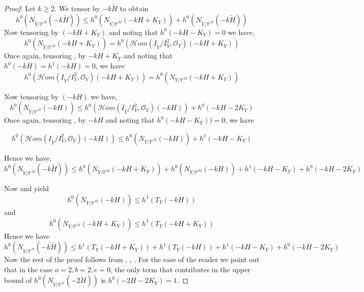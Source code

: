 \documentclass[11pt,twoside]{amsart}
\theoremstyle{plain}
\numberwithin{equation}{section}
\theoremstyle{definition}
\begin{document}
\begin{proof}
   Let $k \geq 2$. We tensor  by $-k\widetilde{H}$ to obtain
    $$h^0(N_{\widetilde{Y}/\mathbb{P}^M}(-k\widetilde{H})) \leq  h^0(N_{\widetilde{Y}/\mathbb{P}^M}(-kH+K_Y)) + h^0(N_{\widetilde{Y}/\mathbb{P}^M}(-k\widetilde{H}))$$
    Now tensoring  by $(-kH+K_Y)$ and noting that $h^0(-kH-K_Y) = 0$ we have,
    $$h^0(N_{\widetilde{Y}/\mathbb{P}^M}(-kH+K_Y)) = h^0(\mathcal{H}om(I_{\widetilde{Y}}/I_{Y}^2, \mathcal{O}_Y)(-kH+K_Y))$$
    Once again, tensoring , by $-kH+K_Y$ and noting that $h^0(-kH) = h^1(-kH) = 0$, we have 
    $$h^0(\mathcal{H}om(I_{\widetilde{Y}}/I_{Y}^2, \mathcal{O}_Y)(-kH+K_Y)) = h^0(N_{Y/\mathbb{P}^M}(-kH+K_Y))$$

    
    Now tensoring  by $(-kH)$ we have,
    $$h^0(N_{\widetilde{Y}/\mathbb{P}^M}(-kH)) \leq h^0(\mathcal{H}om(I_{\widetilde{Y}}/I_{Y}^2, \mathcal{O}_Y)(-kH))+h^0(-kH-2K_Y)$$
    Once again, tensoring , by $-kH$ and noting that $h^0(-kH-K_Y)) = 0$, we have 
   

\color{black}
    $$h^0(\mathcal{H}om(I_{\widetilde{Y}}/I_{Y}^2, \mathcal{O}_Y)(-kH)) \leq h^0(N_{Y/\mathbb{P}^M}(-kH))+h^1(-kH-K_Y)$$

\color{black}
    Hence we have,
    $$h^0(N_{\widetilde{Y}/\mathbb{P}^M}(-k\widetilde{H})) \leq  h^0(N_{Y/\mathbb{P}^M}(-kH+K_Y)) + h^0(N_{Y/\mathbb{P}^M}(-kH)) +  h^1(-kH-K_Y) + h^0(-kH-2K_Y)$$

Now  and  yield %
$$h^0(N_{Y/\mathbb{P}^M}(-kH)) \leq h^1(T_Y(-kH)) $$
and
$$h^0(N_{Y/\mathbb{P}^M}(-kH+K_Y)) \leq h^1(T_Y(-kH+K_Y))$$
Hence we have 
$$h^0(N_{\widetilde{Y}/\mathbb{P}^N}(-k\widetilde{H})) \leq h^1(T_Y(-kH+K_Y)) + h^1(T_Y(-kH)) +  h^1(-kH-K_Y) + h^0(-kH-2K_Y) $$
Now the rest of the proof follows from , , . For the ease of the reader we point out that in the case $a = 2, b = 2, e = 0$, the only term that contributes in the upper bound of $h^0(N_{\widetilde{Y}/\mathbb{P}^N}(-2\widetilde{H}))$ is $h^0(-2H-2K_Y) = 1$. 
\end{proof}
\end{document}
